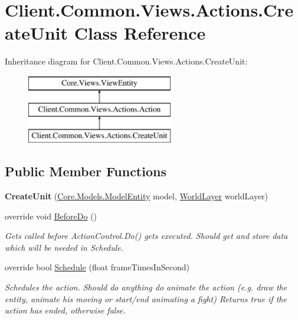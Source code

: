\hypertarget{classClient_1_1Common_1_1Views_1_1Actions_1_1CreateUnit}{\section{Client.\-Common.\-Views.\-Actions.\-Create\-Unit Class Reference}
\label{classClient_1_1Common_1_1Views_1_1Actions_1_1CreateUnit}
}
Inheritance diagram for Client.\-Common.\-Views.\-Actions.\-Create\-Unit\-:\begin{figure}[H]
\begin{center}
\leavevmode
\includegraphics[height=3.000000cm]{classClient_1_1Common_1_1Views_1_1Actions_1_1CreateUnit}
\end{center}
\end{figure}
\subsection*{Public Member Functions}
\begin{DoxyCompactItemize}
\item 
\hypertarget{classClient_1_1Common_1_1Views_1_1Actions_1_1CreateUnit_a8bf52aff23a34d4179c2b8b52844bb1a}{{\bfseries Create\-Unit} (\hyperlink{classCore_1_1Models_1_1ModelEntity}{Core.\-Models.\-Model\-Entity} model, \hyperlink{classClient_1_1Common_1_1Views_1_1WorldLayer}{World\-Layer} world\-Layer)}\label{classClient_1_1Common_1_1Views_1_1Actions_1_1CreateUnit_a8bf52aff23a34d4179c2b8b52844bb1a}

\item 
override void \hyperlink{classClient_1_1Common_1_1Views_1_1Actions_1_1CreateUnit_a651d26ad176e10a51065e513eec90aa8}{Before\-Do} ()
\begin{DoxyCompactList}\small\item\em Gets called before Action\-Control.\-Do() gets executed. Should get and store data which will be needed in Schedule. \end{DoxyCompactList}\item 
override bool \hyperlink{classClient_1_1Common_1_1Views_1_1Actions_1_1CreateUnit_a3b0aeac3eabb7b10b3f8fb287bc96181}{Schedule} (float frame\-Times\-In\-Second)
\begin{DoxyCompactList}\small\item\em Schedules the action. Should do anything do animate the action (e.\-g. draw the entity, animate his moving or start/end animating a fight) Returns true if the action has ended, otherwise false. \end{DoxyCompactList}\end{DoxyCompactItemize}

